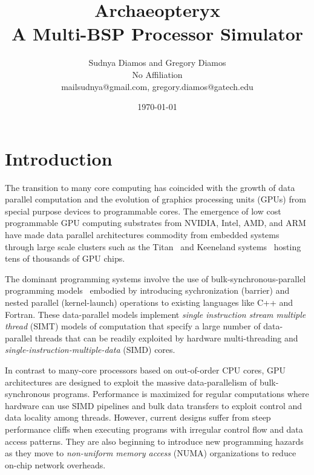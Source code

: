 \documentclass[conference, 10pt]{IEEEtran}
\begin{document}
 

\title{Archaeopteryx\\
A Multi-BSP Processor Simulator}

\author{Sudnya Diamos and Gregory Diamos  \\
No Affiliation \\
{\small mailsudnya@gmail.com, gregory.diamos@gatech.edu}}
\date{\today}

\maketitle

\section{Introduction}
\label{sec:introduction}

The transition to many core computing has coincided with the growth of
data parallel computation and the evolution of graphics processing
units (GPUs) from special purpose devices to programmable cores. 
The emergence of low cost programmable GPU computing substrates from
NVIDIA, Intel, AMD, and ARM have made data parallel architectures commodity
from embedded systems through large scale clusters such as the
Titan~\cite{ref:titan} and Keeneland systems~\cite{ref:keeneland}
hosting tens of thousands of GPU chips.

The dominant programming systems involve the use of
bulk-synchronous-parallel programming models~\cite{ref:bulk-synchronous}
embodied by introducing sychronization (barrier) and nested parallel (kernel-launch)
operations to existing languages like C++ and Fortran.  These data-parallel
models implement \textit{single instruction stream multiple thread} (SIMT)
models of computation that specify a large number of
data-parallel threads that can be readily exploited by hardware
multi-threading and \textit{single-instruction-multiple-data} (SIMD)
cores. 

In contrast to many-core processors based on out-of-order CPU cores,
GPU architectures are designed to exploit the massive data-parallelism of
bulk-synchronous programs. Performance is maximized for regular computations
where hardware can use SIMD pipelines and bulk data transfers to exploit
control and data locality among threads.  However, current designs suffer
from steep performance cliffs when executing programs with irregular control
flow and data access patterns.  
They are also beginning to introduce new
programming hazards as they move to \textit{non-uniform memory access} (NUMA)
organizations to reduce on-chip network overheads.  
\end{document}

